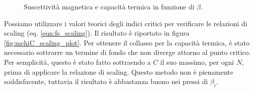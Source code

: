 \documentclass[a4paper,11pt]{article}
\begin{document}
	\begin{figure}
        \caption{Suscettività magnetica e capacità termica in funzione di $\beta$.}
        \label{fig:chiC_plot}
	\end{figure}
	
	Possiamo utilizzare i valori teorici degli indici critici per verificare le relazioni di scaling (eq. \ref{eqn:fs_scaling}). Il risultato è riportato in figura \ref{fig:mchiC_scaling_plot}. Per ottenere il collasso per la capacità termica, è stato necessario sottrarre un termine di fondo che non diverge attorno al punto critico. Per semplicità, questo è stato fatto sottraendo a $C$ il suo massimo, per ogni $N$, prima di applicare la relazione di scaling. Questo metodo non è pienamente soddisfacente, tuttavia il risultato è abbastanza buono nei pressi di $\beta_c$. 
	
\end{document}
